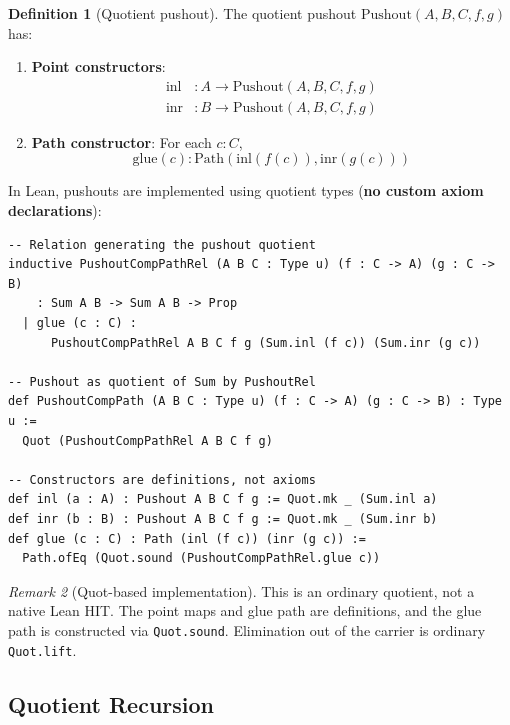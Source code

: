 \documentclass{lmcs}
\theoremstyle{definition}
\newtheorem{definition}{Definition}[section]
\theoremstyle{plain}
\theoremstyle{remark}
\newtheorem{remark}[definition]{Remark}
\newcommand{\Path}{\mathrm{Path}}
\newcommand{\Pushout}{\mathrm{Pushout}}
\newcommand{\inl}{\mathrm{inl}}
\newcommand{\inr}{\mathrm{inr}}
\newcommand{\glmark}{\mathrm{glue}}
\begin{document}
\begin{definition}[Quotient pushout]
\label{def:pushout}
The quotient pushout $\Pushout(A, B, C, f, g)$ has:
\begin{enumerate}
    \item \textbf{Point constructors}:
    \begin{align*}
    \inl &: A \to \Pushout(A, B, C, f, g) \\
    \inr &: B \to \Pushout(A, B, C, f, g)
    \end{align*}

    \item \textbf{Path constructor}: For each $c : C$,
    \[
    \glmark(c) : \Path(\inl(f(c)), \inr(g(c)))
    \]
\end{enumerate}
\end{definition}

In Lean, pushouts are implemented using quotient types (\textbf{no custom axiom declarations}):
\begin{lstlisting}
-- Relation generating the pushout quotient
inductive PushoutCompPathRel (A B C : Type u) (f : C -> A) (g : C -> B)
    : Sum A B -> Sum A B -> Prop
  | glue (c : C) :
      PushoutCompPathRel A B C f g (Sum.inl (f c)) (Sum.inr (g c))

-- Pushout as quotient of Sum by PushoutRel
def PushoutCompPath (A B C : Type u) (f : C -> A) (g : C -> B) : Type u :=
  Quot (PushoutCompPathRel A B C f g)

-- Constructors are definitions, not axioms
def inl (a : A) : Pushout A B C f g := Quot.mk _ (Sum.inl a)
def inr (b : B) : Pushout A B C f g := Quot.mk _ (Sum.inr b)
def glue (c : C) : Path (inl (f c)) (inr (g c)) :=
  Path.ofEq (Quot.sound (PushoutCompPathRel.glue c))
\end{lstlisting}

\begin{remark}[Quot-based implementation]
This is an ordinary quotient, not a native Lean HIT.  The point maps and glue
path are definitions, and the glue path is constructed via
\texttt{Quot.sound}.  Elimination out of the carrier is ordinary
\texttt{Quot.lift}.
\end{remark}

\subsection{Quotient Recursion}
\end{document}
